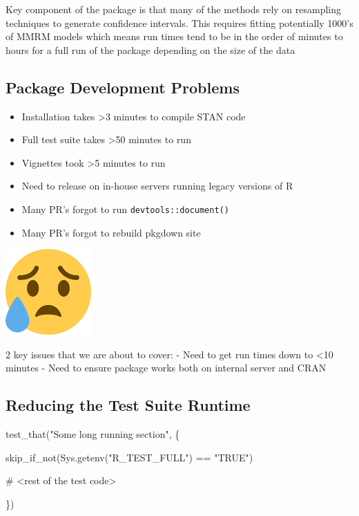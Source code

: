 \documentclass[
  letterpaper,
  DIV=11,
  numbers=noendperiod]{scrartcl}
\newenvironment{Shaded}{\begin{snugshade}}{\end{snugshade}}
\newcommand{\CommentTok}[1]{\textcolor[rgb]{0.37,0.37,0.37}{#1}}
\newcommand{\FunctionTok}[1]{\textcolor[rgb]{0.28,0.35,0.67}{#1}}
\newcommand{\NormalTok}[1]{\textcolor[rgb]{0.00,0.23,0.31}{#1}}
\newcommand{\SpecialCharTok}[1]{\textcolor[rgb]{0.37,0.37,0.37}{#1}}
\newcommand{\StringTok}[1]{\textcolor[rgb]{0.13,0.47,0.30}{#1}}
\providecommand{\tightlist}{%
  \setlength{\itemsep}{0pt}\setlength{\parskip}{0pt}}\usepackage{longtable,booktabs,array}
\begin{document}
Key component of the package is that many of the methods rely on
resampling techniques to generate confidence intervals. This requires
fitting potentially 1000's of MMRM models which means run times tend to
be in the order of minutes to hours for a full run of the package
depending on the size of the data

\hypertarget{package-development-problems}{%
\subsection{Package Development
Problems}\label{package-development-problems}}

\begin{itemize}
\tightlist
\item
  Installation takes \textgreater3 minutes to compile STAN code
\item
  Full test suite takes \textgreater50 minutes to run
\item
  Vignettes took \textgreater5 minutes to run
\item
  Need to release on in-house servers running legacy versions of R
\item
  Many PR's forgot to run \texttt{devtools::document()}
\item
  Many PR's forgot to rebuild pkgdown site
\end{itemize}

\includegraphics{sad-emoji.png}

2 key issues that we are about to cover: - Need to get run times down to
\textless10 minutes - Need to ensure package works both on internal
server and CRAN

\hypertarget{reducing-the-test-suite-runtime}{%
\subsection{Reducing the Test Suite
Runtime}\label{reducing-the-test-suite-runtime}}

\begin{Shaded}
\begin{Highlighting}[]
\FunctionTok{test\_that}\NormalTok{(}\StringTok{"Some long running section"}\NormalTok{, \{}
  
    \FunctionTok{skip\_if\_not}\NormalTok{(}\FunctionTok{Sys.getenv}\NormalTok{(}\StringTok{"R\_TEST\_FULL"}\NormalTok{) }\SpecialCharTok{==} \StringTok{"TRUE"}\NormalTok{)}
    
    \CommentTok{\# \textless{}rest of the test code\textgreater{}}
    
\NormalTok{\})}
\end{Highlighting}
\end{Shaded}
\end{document}
